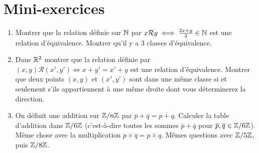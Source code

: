 \section{Mini-exercices}

\begin{frame}
\begin{miniexercice}
\begin{enumerate}
  \item Montrer que la relation définie sur $\mathbb{N}$ par $x \mathcal{R} y \iff \frac{2x+y}{3} \in \mathbb{N}$ est une relation d'équivalence.
Montrer qu'il y a $3$ classes d'équivalence.

  \item Dans $\mathbb{R}^2$ montrer que la relation définie par $(x,y) \mathcal{R} (x',y') \iff x+y'=x'+y$ est une relation d'équivalence.
Montrer que deux points $(x,y)$ et $(x',y')$ sont dans une même classe si et seulement s'ils appartiennent à une même droite 
dont vous déterminerez la direction.

  \item On définit une addition sur $\mathbb{Z}/n\mathbb{Z}$ par $\overline{p} + \overline{q}= \overline{p + q}$.
Calculer la table d'addition dans $\mathbb{Z}/6\mathbb{Z}$ (c'est-à-dire toutes les sommes $\overline{p} + \overline{q}$
pour $\overline{p},\overline{q} \in \mathbb{Z}/6\mathbb{Z}$). Même chose avec la multiplication $\overline{p}\times \overline{q}= \overline{p\times q}$.
Mêmes questions avec $\mathbb{Z}/5\mathbb{Z}$, puis $\mathbb{Z}/8\mathbb{Z}$.
\end{enumerate}
\end{miniexercice}
\end{frame}



